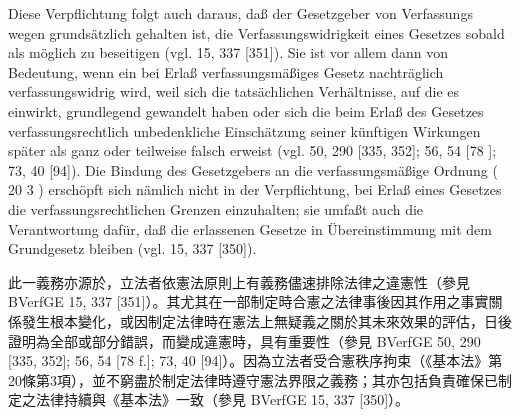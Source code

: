 \documentclass[12pt]{article}
\begin{document}
\begin{sourcepara}[title={原文E.189}]
Diese Verpflichtung folgt auch daraus, daß der Gesetzgeber von Verfassungs wegen grundsätzlich gehalten ist, die Verfassungswidrigkeit eines Gesetzes sobald als möglich zu beseitigen (vgl. \abbrBVerfGE{} 15, 337 [351]). Sie ist vor allem dann von Bedeutung, wenn ein bei Erlaß verfassungsmäßiges Gesetz nachträglich verfassungswidrig wird, weil sich die tatsächlichen Verhältnisse, auf die es einwirkt, grundlegend gewandelt haben oder sich die beim Erlaß des Gesetzes verfassungsrechtlich unbedenkliche Einschätzung seiner künftigen Wirkungen später als ganz oder teilweise falsch erweist (vgl. \abbrBVerfGE{} 50, 290 [335, 352]; 56, 54 [78 \abbrF{}]; 73, 40 [94]). Die Bindung des Gesetzgebers an die verfassungsmäßige Ordnung (\abbrArt{} 20 \abbrAbs{} 3 \abbrGG{}\ggfnArtTwentyThreeDE{}) erschöpft sich nämlich nicht in der Verpflichtung, bei Erlaß eines Gesetzes die verfassungsrechtlichen Grenzen einzuhalten; sie umfaßt auch die Verantwortung dafür, daß die erlassenen Gesetze in Übereinstimmung mit dem Grundgesetz bleiben (vgl. \abbrBVerfGE{} 15, 337 [350]).
\end{sourcepara}
\begin{transpara}
此一義務亦源於，立法者依憲法原則上有義務儘速排除法律之違憲性（參見 BVerfGE 15, 337 [351]）。其尤其在一部制定時合憲之法律事後因其作用之事實關係發生根本變化，或因制定法律時在憲法上無疑義之關於其未來效果的評估，日後證明為全部或部分錯誤，而變成違憲時，具有重要性（參見 BVerfGE 50, 290 [335, 352]; 56, 54 [78 f.]; 73, 40 [94]）。因為立法者受合憲秩序拘束（《基本法》第20條第3項\ggfnArtTwentyThreeZH{}），並不窮盡於制定法律時遵守憲法界限之義務；其亦包括負責確保已制定之法律持續與《基本法》一致（參見 BVerfGE 15, 337 [350]）。
\end{transpara}
\end{document}
